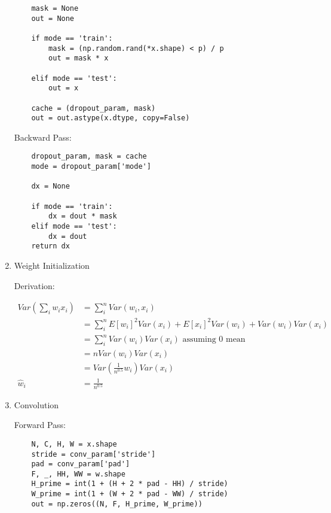 \documentclass[12pt,letter]{article}
\begin{document}
\begin{enumerate}
\begin{verbatim}
    mask = None
    out = None
    
    if mode == 'train':
        mask = (np.random.rand(*x.shape) < p) / p
        out = mask * x

    elif mode == 'test':
        out = x

    cache = (dropout_param, mask)
    out = out.astype(x.dtype, copy=False)
\end{verbatim}

  Backward Pass:

\begin{verbatim}
    dropout_param, mask = cache
    mode = dropout_param['mode']

    dx = None

    if mode == 'train':
        dx = dout * mask
    elif mode == 'test':
        dx = dout
    return dx
\end{verbatim}

  \pagebreak
  
\item Weight Initialization

  Derivation:

  \begin{align*}
    Var(\sum_i w_i x_i) &= \sum_i^n Var(w_i, x_i)\\
                        &= \sum_i^n E[w_i]^2 Var(x_i) + E[x_i]^2 Var(w_i) + Var(w_i) Var(x_i)\\
                        &= \sum_i^n Var(w_i) Var(x_i) \text{ assuming 0 mean}\\
                        &= n Var(w_i) Var(x_i)\\
                        &= Var(\frac{1}{n^{0.5}} w_i) Var(x_i)\\
    \hat{w}_i &= \frac{1}{n^{0.5}}
  \end{align*}

  \pagebreak

\item Convolution

Forward Pass:
\begin{verbatim}
    N, C, H, W = x.shape
    stride = conv_param['stride']
    pad = conv_param['pad']
    F, _, HH, WW = w.shape
    H_prime = int(1 + (H + 2 * pad - HH) / stride)
    W_prime = int(1 + (W + 2 * pad - WW) / stride)
    out = np.zeros((N, F, H_prime, W_prime))


\end{verbatim}
\end{enumerate}
\end{document}
